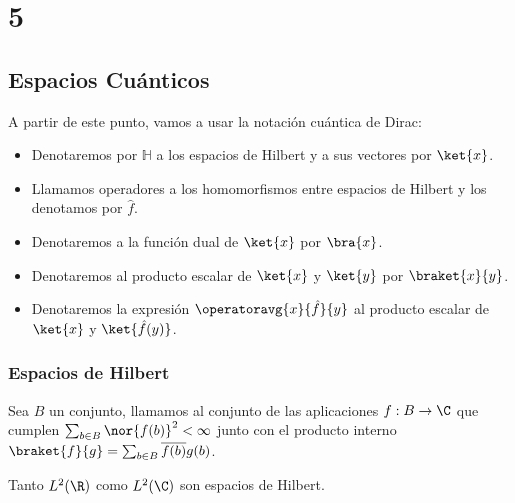 \chapter{5}\label{ch:5}
\section{Espacios Cuánticos}
A partir de este punto, vamos a usar la notación cuántica de Dirac:
\begin{itemize}
  \item Denotaremos por $\mathbb{H}$ a los espacios de Hilbert y a sus vectores por $\ket{x}$.
  \item Llamamos operadores a los homomorfismos entre espacios de Hilbert y los denotamos por $\hat{f}$.
  \item Denotaremos a la función dual de $\ket{x}$ por $\bra{x}$.
  \item Denotaremos al producto escalar de $\ket{x}$ y $\ket{y}$ por $\braket{x}{y}$.
  \item Denotaremos la expresión $\operatoravg{x}{\hat{f}}{y}$ al producto escalar de ${\ket{x}}$ y $\ket{\hat{f}(y)}$.
\end{itemize}

\subsection{Espacios de Hilbert}

Sea $B$ un conjunto, llamamos  al conjunto de las aplicaciones $f:B\rightarrow\C$ que cumplen $\sum_{b\in B}\nor{f(b)}^2 < \infty$ junto con el producto interno $\braket{f}{g}=\sum_{b\in B}\overline{f(b)}g(b)$.

\begin{resultado}
  Tanto $L^2(\R)$ como $L^2(\C)$ son espacios de Hilbert.
\end{resultado}
